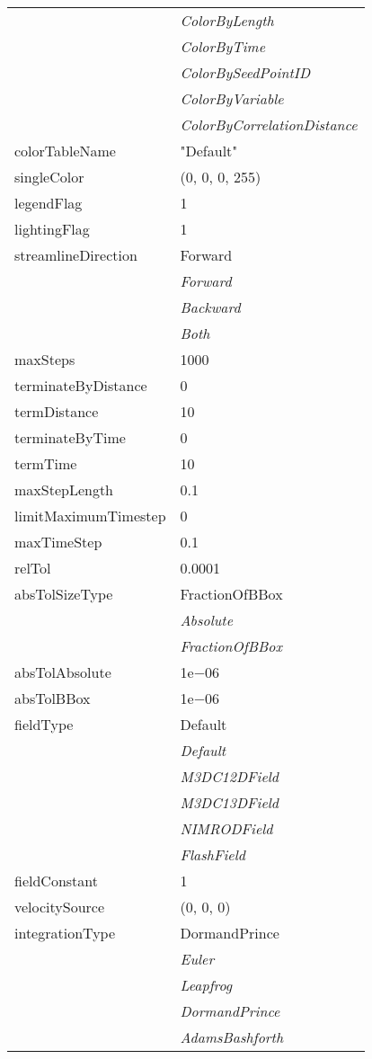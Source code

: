 \documentclass[10pt,a4paper]{report}
\begin{document}
\begin{longtable}{ll}
 & {\it  ColorByLength} \\
 & {\it  ColorByTime} \\
 & {\it  ColorBySeedPointID} \\
 & {\it  ColorByVariable} \\
 & {\it  ColorByCorrelationDistance} \\
colorTableName  &  "Default" \\
singleColor  &  (0, 0, 0, 255) \\
legendFlag  &  1 \\
lightingFlag  &  1 \\
streamlineDirection  &  Forward   \\
 & {\it  Forward} \\
 & {\it  Backward} \\
 & {\it  Both} \\
maxSteps  &  1000 \\
terminateByDistance  &  0 \\
termDistance  &  10 \\
terminateByTime  &  0 \\
termTime  &  10 \\
maxStepLength  &  0.1 \\
limitMaximumTimestep  &  0 \\
maxTimeStep  &  0.1 \\
relTol  &  0.0001 \\
absTolSizeType  &  FractionOfBBox   \\
 & {\it  Absolute} \\
 & {\it  FractionOfBBox} \\
absTolAbsolute  &  1e$-$06 \\
absTolBBox  &  1e$-$06 \\
fieldType  &  Default   \\
 & {\it  Default} \\
 & {\it  M3DC12DField} \\
 & {\it  M3DC13DField} \\
 & {\it  NIMRODField} \\
 & {\it  FlashField} \\
fieldConstant  &  1 \\
velocitySource  &  (0, 0, 0) \\
integrationType  &  DormandPrince   \\
 & {\it  Euler} \\
 & {\it  Leapfrog} \\
 & {\it  DormandPrince} \\
 & {\it  AdamsBashforth} \\

\end{longtable}
\end{document}
